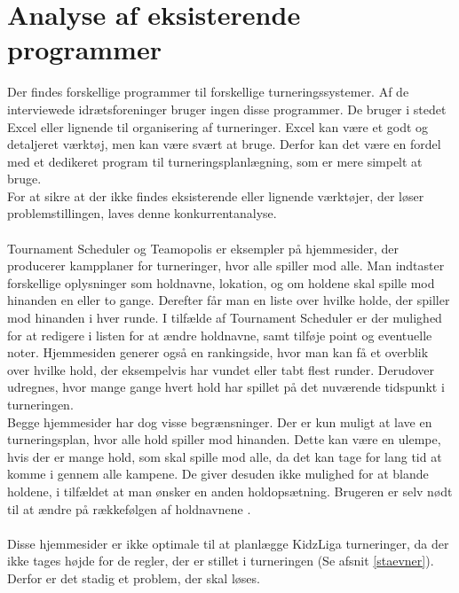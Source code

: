 \section{Analyse af eksisterende programmer}
Der findes forskellige programmer til forskellige turneringssystemer. Af de interviewede idrætsforeninger bruger ingen disse programmer. De bruger i stedet Excel eller lignende til organisering af turneringer. Excel kan være et godt og detaljeret værktøj, men kan være svært at bruge. Derfor kan det være en fordel med et dedikeret program til turneringsplanlægning, som er mere simpelt at bruge.\\
For at sikre at der ikke findes eksisterende eller lignende værktøjer, der løser problemstillingen, laves denne konkurrentanalyse.
\\\\
Tournament Scheduler og Teamopolis er eksempler på hjemmesider, der producerer kampplaner for turneringer, hvor alle spiller mod alle. Man indtaster forskellige oplysninger som holdnavne, lokation, og om holdene skal spille mod hinanden en eller to gange. Derefter får man en liste over hvilke holde, der spiller mod hinanden i hver runde. I tilfælde af Tournament Scheduler er der mulighed for at redigere i listen for at ændre holdnavne, samt tilføje point og eventuelle noter. Hjemmesiden generer også en rankingside, hvor man kan få et overblik over hvilke hold, der eksempelvis har vundet eller tabt flest runder. Derudover udregnes, hvor mange gange hvert hold har spillet på det nuværende tidspunkt i turneringen.\\
Begge hjemmesider har dog visse begrænsninger. Der er kun muligt at lave en turneringsplan, hvor alle hold spiller mod hinanden. Dette kan være en ulempe, hvis der er mange hold, som skal spille mod alle, da det kan tage for lang tid at komme i gennem alle kampene. De giver desuden ikke mulighed for at blande holdene, i tilfældet at man ønsker en anden holdopsætning. Brugeren er selv nødt til at ændre på rækkefølgen af holdnavnene \citep{Teamopolis}\citep{TournamentScheduler}.
\\\\
Disse hjemmesider er ikke optimale til at planlægge KidzLiga turneringer, da der ikke tages højde for de regler, der er stillet i turneringen (Se afsnit \ref{staevner}). Derfor er det stadig et problem, der skal løses. 